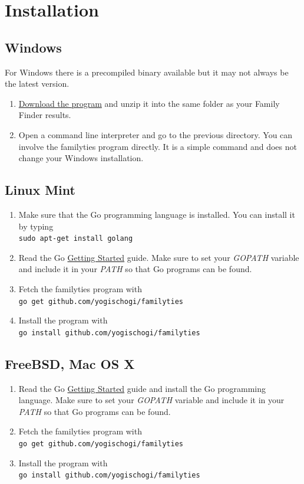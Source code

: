 \documentclass[12pt,a4paper]{article}
\begin{document}
\section{Installation}

\subsection{Windows}
For Windows there is a precompiled binary available but it
may not always be the latest version.
\begin{enumerate}
\item \href{http://www.projectory.de/genetics/familyties.zip}
  {Download the program} and unzip it into the same folder
  as your Family Finder results.
\item Open a command line interpreter and go to the previous
  directory. You can involve the familyties program directly.
  It is a simple command and does not change your Windows
  installation.
\end{enumerate}

\subsection{Linux Mint}
\begin{enumerate}
\item Make sure that the Go programming language is installed.
	You can install it by typing\\
	\texttt{sudo apt-get install golang}
\item Read the Go
	\href{http://golang.org/doc/install}{Getting Started}
	guide. Make sure to set your \emph{GOPATH} variable and
	include it in your \emph{PATH} so that Go programs can be
	found.
\item Fetch the familyties program with\\
	\texttt{go get github.com/yogischogi/familyties}
\item Install the program with\\
	 \texttt{go install github.com/yogischogi/familyties}
\end{enumerate}

\subsection{FreeBSD, Mac OS X}
\begin{enumerate}
\item Read the Go
	\href{http://golang.org/doc/install}{Getting Started}
	guide and install the Go programming language. 
    Make sure to set your \emph{GOPATH} variable and
	include it in your \emph{PATH} so that Go programs can be
	found.
\item Fetch the familyties program with\\
	\texttt{go get github.com/yogischogi/familyties}
\item Install the program with\\
	 \texttt{go install github.com/yogischogi/familyties}
\end{enumerate}
\end{document}
